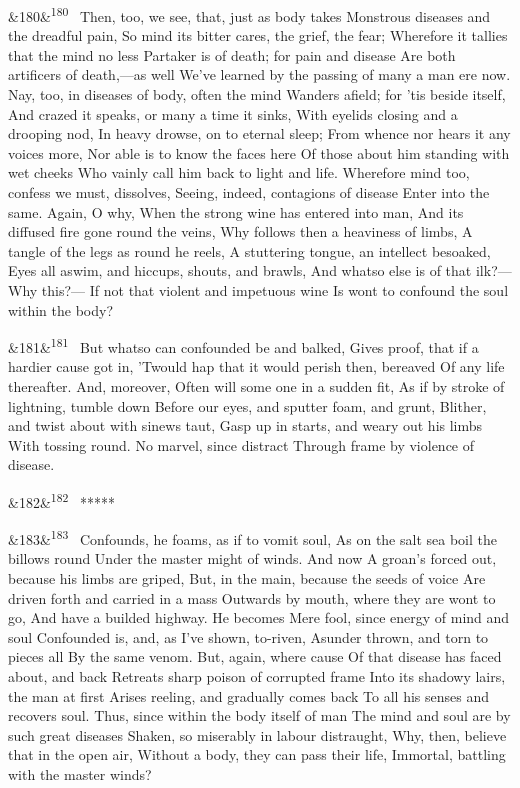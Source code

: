 \documentclass[12pt]{article}
\newcommand{\para}[1][]{\par\noindent\ifx&#1&\else\textsuperscript{\footnotesize #1}~\fi}
\begin{document}
\para[180] Then, too, we see, that, just as body takes Monstrous diseases and the dreadful pain, So mind its bitter cares, the grief, the fear; Wherefore it tallies that the mind no less Partaker is of death; for pain and disease Are both artificers of death,---as well We've learned by the passing of many a man ere now. Nay, too, in diseases of body, often the mind Wanders afield; for 'tis beside itself, And crazed it speaks, or many a time it sinks, With eyelids closing and a drooping nod, In heavy drowse, on to eternal sleep; From whence nor hears it any voices more, Nor able is to know the faces here Of those about him standing with wet cheeks Who vainly call him back to light and life. Wherefore mind too, confess we must, dissolves, Seeing, indeed, contagions of disease Enter into the same. Again, O why, When the strong wine has entered into man, And its diffused fire gone round the veins, Why follows then a heaviness of limbs, A tangle of the legs as round he reels, A stuttering tongue, an intellect besoaked, Eyes all aswim, and hiccups, shouts, and brawls, And whatso else is of that ilk?---Why this?--- If not that violent and impetuous wine Is wont to confound the soul within the body?

\para[181] But whatso can confounded be and balked, Gives proof, that if a hardier cause got in, 'Twould hap that it would perish then, bereaved Of any life thereafter. And, moreover, Often will some one in a sudden fit, As if by stroke of lightning, tumble down Before our eyes, and sputter foam, and grunt, Blither, and twist about with sinews taut, Gasp up in starts, and weary out his limbs With tossing round. No marvel, since distract Through frame by violence of disease.

\para[182] *****

\para[183] Confounds, he foams, as if to vomit soul, As on the salt sea boil the billows round Under the master might of winds. And now A groan's forced out, because his limbs are griped, But, in the main, because the seeds of voice Are driven forth and carried in a mass Outwards by mouth, where they are wont to go, And have a builded highway. He becomes Mere fool, since energy of mind and soul Confounded is, and, as I've shown, to-riven, Asunder thrown, and torn to pieces all By the same venom. But, again, where cause Of that disease has faced about, and back Retreats sharp poison of corrupted frame Into its shadowy lairs, the man at first Arises reeling, and gradually comes back To all his senses and recovers soul. Thus, since within the body itself of man The mind and soul are by such great diseases Shaken, so miserably in labour distraught, Why, then, believe that in the open air, Without a body, they can pass their life, Immortal, battling with the master winds?
\end{document}
